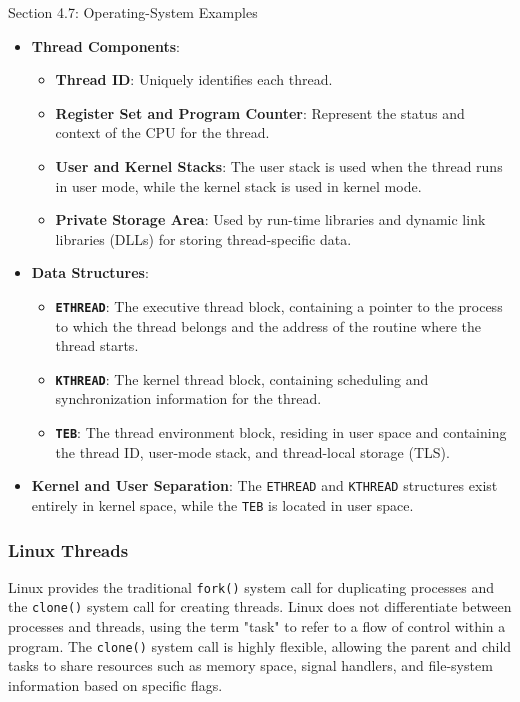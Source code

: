 \begin{notes}{Section 4.7: Operating-System Examples}
\begin{highlight}
        \begin{itemize}
            \item \textbf{Thread Components}:
                \begin{itemize}
                    \item \textbf{Thread ID}: Uniquely identifies each thread.
                    \item \textbf{Register Set and Program Counter}: Represent the status and context of the CPU for the thread.
                    \item \textbf{User and Kernel Stacks}: The user stack is used when the thread runs in user mode, while the kernel stack is used in kernel mode.
                    \item \textbf{Private Storage Area}: Used by run-time libraries and dynamic link libraries (DLLs) for storing thread-specific data.
                \end{itemize}
            \item \textbf{Data Structures}:
                \begin{itemize}
                    \item \textbf{\texttt{ETHREAD}}: The executive thread block, containing a pointer to the process to which the thread belongs and the address of the routine where the thread starts.
                    \item \textbf{\texttt{KTHREAD}}: The kernel thread block, containing scheduling and synchronization information for the thread.
                    \item \textbf{\texttt{TEB}}: The thread environment block, residing in user space and containing the thread ID, user-mode stack, and thread-local storage (TLS).
                \end{itemize}
            \item \textbf{Kernel and User Separation}: The \texttt{ETHREAD} and \texttt{KTHREAD} structures exist entirely in kernel space, while the \texttt{TEB} is located in user space.
        \end{itemize}
    
    \end{highlight}
    
    \subsubsection*{Linux Threads}
    
    Linux provides the traditional \texttt{fork()} system call for duplicating processes and the \texttt{clone()} system call for creating threads. Linux does not differentiate between processes and 
    threads, using the term "task" to refer to a flow of control within a program. The \texttt{clone()} system call is highly flexible, allowing the parent and child tasks to share resources such as 
    memory space, signal handlers, and file-system information based on specific flags.
    

\end{notes}
